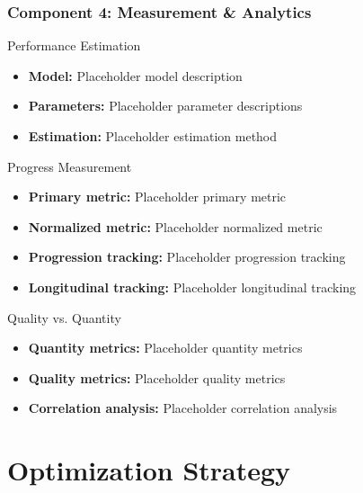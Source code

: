 \begin{frame}
\frametitle{Component 4: Measurement \& Analytics}
\begin{block}{Performance Estimation}
\begin{itemize}
\item \textbf{Model:} Placeholder model description
\item \textbf{Parameters:} Placeholder parameter descriptions
\item \textbf{Estimation:} Placeholder estimation method
\end{itemize}
\end{block}

\begin{block}{Progress Measurement}
\begin{itemize}
\item \textbf{Primary metric:} Placeholder primary metric
\item \textbf{Normalized metric:} Placeholder normalized metric
\item \textbf{Progression tracking:} Placeholder progression tracking
\item \textbf{Longitudinal tracking:} Placeholder longitudinal tracking
\end{itemize}
\end{block}

\begin{block}{Quality vs. Quantity}
\begin{itemize}
\item \textbf{Quantity metrics:} Placeholder quantity metrics
\item \textbf{Quality metrics:} Placeholder quality metrics
\item \textbf{Correlation analysis:} Placeholder correlation analysis
\end{itemize}
\end{block}
\end{frame}

\section{Optimization Strategy}\label{sec:optimization}

